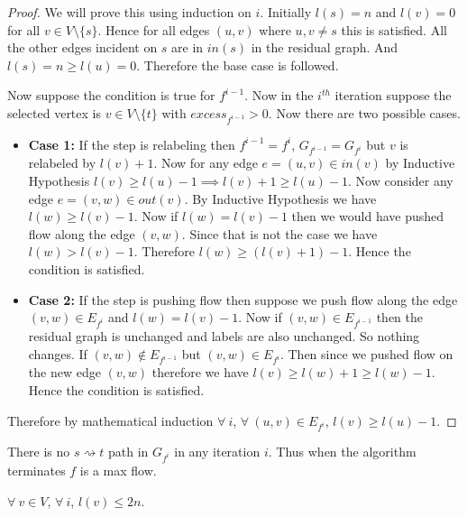 \begin{proof}
	We will prove this using induction on $i$. Initially $l(s)=n$ and $l(v)=0$ for all $v\in V\setminus\{s\}$. Hence for all edges $(u,v)$ where $u,v\neq s$ this is satisfied. All the other edges incident on $s$ are in $\textit{in}(s)$ in the residual graph. And $l(s)=n\geq l(u)=0$. Therefore the base case is followed. 
	
	Now suppose the condition is true for $f^{i-1}$. Now in the $i^{th}$ iteration   suppose the selected vertex is $v\in V\setminus\{t\}$ with $\textit{excess}_{f^{i-1}}>0$. Now there are two possible cases.\begin{itemize}[label=$\bullet$]
		\item \textbf{Case 1:} If the step is relabeling then $f^{i-1}=f^i$, $G_{f^{i-1}}=G_{f^i}$ but $v$ is relabeled by $l(v)+1$. Now for any edge $e=(u,v)\in \textit{in}(v)$ by Inductive Hypothesis $l(v)\geq l(u)-1\implies l(v)+1\geq l(u)-1$. Now consider any edge $e=(v,w)\in \textit{out}(v)$.  By Inductive Hypothesis we have $l(w)\geq l(v)-1$. Now if $l(w)=l(v)-1$ then we would have pushed flow along the edge $(v,w)$. Since that is not the case we have $l(w)>l(v)-1$. Therefore $l(w)\geq (l(v)+1)-1$. Hence the condition is satisfied.
		\item \textbf{Case 2:} If the step is pushing flow then suppose we push flow along the edge $(v,w)\in E_{f^i}$ and $l(w)=l(v)-1$. Now if $(v,w)\in E_{f^{i-1}}$ then the residual graph is unchanged and labels are also unchanged. So nothing changes. If $(v,w)\notin E_{f^{i-1}}$ but  $(v,w)\in E_{f^{i}}$. Then since we pushed flow on the new edge $(v,w)$ therefore we have $l(v)\geq l(w)+1\geq l(w)-1$.  Hence the condition is satisfied.
	\end{itemize}
Therefore by mathematical induction $\forall\ i$, $\forall \ (u,v)\in E_{f^i}$, $l(v)\geq l(u)-1$.
\end{proof}

\begin{corolary}{}{}
	There is no $s\rightsquigarrow t$ path in $G_{f^i}$ in any iteration $i$. Thus when the algorithm terminates $f$ is a max flow.
\end{corolary}
\begin{corolary}{}{}
	$\forall\ v\in V$, $\forall\ i$, $l(v)\leq 2n$.
\end{corolary}